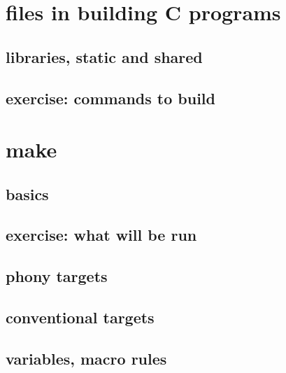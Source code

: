 
\section{files in building C programs}



\subsection{libraries, static and shared}



\subsection{exercise: commands to build}



\section{make}

\subsection{basics}



\subsection{exercise: what will be run}



\subsection{phony targets}



\subsection{conventional targets}



\subsection{variables, macro rules}

